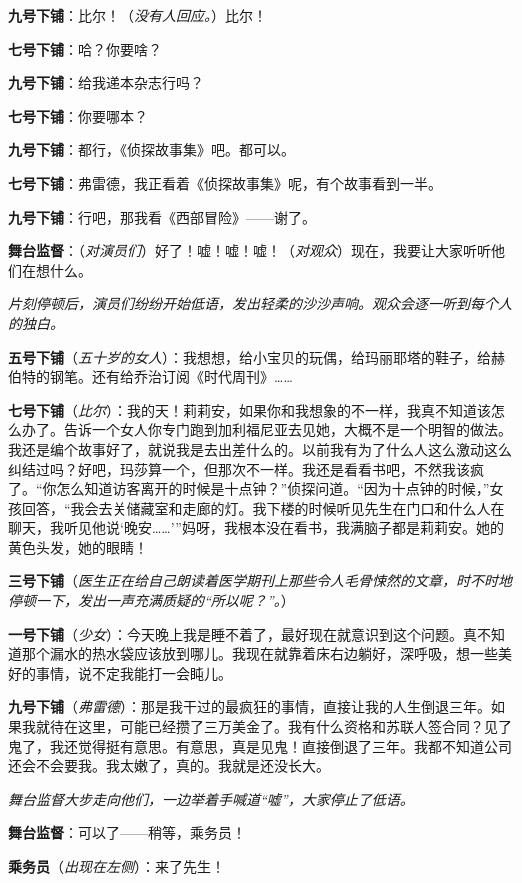 \documentclass[lang=cn,newtx,12pt,scheme=chinese]{elegantbook}
\begin{document}
\textbf{九号下铺}：比尔！（\textit{没有人回应。}）比尔！

\textbf{七号下铺}：哈？你要啥？

\textbf{九号下铺}：给我递本杂志行吗？

\textbf{七号下铺}：你要哪本？

\textbf{九号下铺}：都行，《侦探故事集》吧。都可以。

\textbf{七号下铺}：弗雷德，我正看着《侦探故事集》呢，有个故事看到一半。

\textbf{九号下铺}：行吧，那我看《西部冒险》——谢了。

\textbf{舞台监督}：（\textit{对演员们}）好了！嘘！嘘！嘘！（\textit{对观众}）现在，我要让大家听听他们在想什么。

\textit{片刻停顿后，演员们纷纷开始低语，发出轻柔的沙沙声响。观众会逐一听到每个人的独白。}

\textbf{五号下铺}（\textit{五十岁的女人}）：我想想，给小宝贝的玩偶，给玛丽耶塔的鞋子，给赫伯特的钢笔。还有给乔治订阅《时代周刊》……

\textbf{七号下铺}（\textit{比尔}）：我的天！莉莉安，如果你和我想象的不一样，我真不知道该怎么办了。告诉一个女人你专门跑到加利福尼亚去见她，大概不是一个明智的做法。我还是编个故事好了，就说我是去出差什么的。以前我有为了什么人这么激动这么纠结过吗？好吧，玛莎算一个，但那次不一样。我还是看看书吧，不然我该疯了。“你怎么知道访客离开的时候是十点钟？”侦探问道。“因为十点钟的时候，”女孩回答，“我会去关储藏室和走廊的灯。我下楼的时候听见先生在门口和什么人在聊天，我听见他说‘晚安……’”妈呀，我根本没在看书，我满脑子都是莉莉安。她的黄色头发，她的眼睛！

\textbf{三号下铺}（\textit{医生正在给自己朗读着医学期刊上那些令人毛骨悚然的文章，时不时地停顿一下，发出一声充满质疑的“所以呢？”。}）

\textbf{一号下铺}（\textit{少女}）：今天晚上我是睡不着了，最好现在就意识到这个问题。真不知道那个漏水的热水袋应该放到哪儿。我现在就靠着床右边躺好，深呼吸，想一些美好的事情，说不定我能打一会盹儿。

\textbf{九号下铺}（\textit{弗雷德}）：那是我干过的最疯狂的事情，直接让我的人生倒退三年。如果我就待在这里，可能已经攒了三万美金了。我有什么资格和苏联人签合同？见了鬼了，我还觉得挺有意思。有意思，真是见鬼！直接倒退了三年。我都不知道公司还会不会要我。我太嫩了，真的。我就是还没长大。

\textit{舞台监督大步走向他们，一边举着手喊道“嘘”，大家停止了低语。}

\textbf{舞台监督}：可以了——稍等，乘务员！

\textbf{乘务员}（\textit{出现在左侧}）：来了先生！
\end{document}
